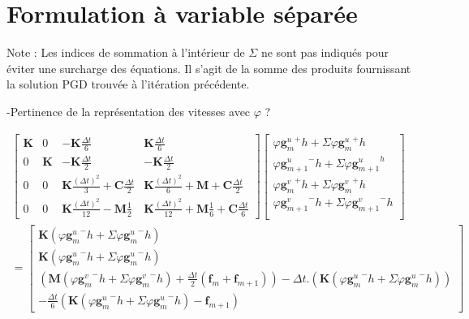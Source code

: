 \documentclass[12pt,a4paper]{report}
\begin{document}
\chapter{Formulation à variable séparée }

Note : Les indices de sommation à l'intérieur de $\Sigma$ ne sont pas indiqués pour éviter une surcharge des équations. Il s'agit de la somme des produits fournissant la solution PGD trouvée à l'itération précédente.

-Pertinence de la représentation des vitesses avec $\varphi$ ?

\begin{equation}
\begin{array}{c}
		\begin{bmatrix}   
		   		\mathbf{K}
			&
		   		0
		   	&
			   	-\mathbf{K} \frac{\Delta t}{6} 
		   	&
		   		\mathbf{K} \frac{\Delta t}{6} 
		\\ 	     
			   0 
			&
				\mathbf{K} 
		   	&
		   		-\mathbf{K} \frac{\Delta t}{2} 
		   	&
		   		-\mathbf{K} \frac{\Delta t}{2}
		\\   
		   		0
		   	& 
		   		0
		   	&
			   	\mathbf{K}
			   		\frac{(\Delta t)^2}{3} 
		   		+\mathbf{C} \frac{\Delta t}{2}
		   	&
		   		\mathbf{K} \frac{(\Delta t)^2}{6} 
		   		+\mathbf{M} 
			   	+\mathbf{C} \frac{\Delta t}{2}
		\\    
		   		0
		   	&
		   		0
		   	&
		   		\mathbf{K} \frac{(\Delta t)^2}{12}
		   		-\mathbf{M}
			   		\frac{1}{2} 
		   	&
		   		\mathbf{K} \frac{(\Delta t)^2}{12}
		   		+\mathbf{M} \frac{1}{6} 
			   +\mathbf{C} \frac{\Delta t}{6} 
	\end{bmatrix}
	\begin{bmatrix}
		   \varphi {\mathbf{g}^u_m}^+ h + \Sigma \varphi {\mathbf{g}^u_m}^+ h 		\\
		   \varphi {\mathbf{g}^u_{m+1}}^- h + \Sigma \varphi {\mathbf{g}^u_{m+1}}^ h  	\\
		   \varphi {\mathbf{g}^v_m}^+  h + \Sigma \varphi {\mathbf{g}^v_m}^+ h 		\\
		   \varphi {\mathbf{g}^v_{m+1}}^-  h + \Sigma \varphi {\mathbf{g}^v_{m+1}}^- h 	\\
	\end{bmatrix}
	\\ =
	\begin{bmatrix}	
		  \mathbf{K} (\varphi {\mathbf{g}^u_m}^- h + \Sigma \varphi {\mathbf{g}^u_m}^- h)
		\\ \mathbf{K} (\varphi {\mathbf{g}^u_m}^- h + \Sigma \varphi {\mathbf{g}^u_m}^-  h)
		\\ 	\left( \mathbf{M}  (\varphi {\mathbf{g}^v_m}^- h + \Sigma \varphi {\mathbf{g}^v_m}^- h)
		     			+\frac{\Delta t}{2}  (\mathbf{f}_m + \mathbf{f}_{m+1})
			  \right)
			-\Delta t.
			 \left( \mathbf{K}  (\varphi {\mathbf{g}^u_m}^- h + \Sigma \varphi {\mathbf{g}^u_m}^- h)
			  \right)
		\\-\frac{\Delta t}{6}
				\left( \mathbf{K}  (\varphi {\mathbf{g}^u_m}^- h + \Sigma \varphi {\mathbf{g}^u_m}^- h)
						-\mathbf{f}_{m+1}
				\right)
					  

\end{bmatrix}
\end{array}
\end{equation}
\end{document}
